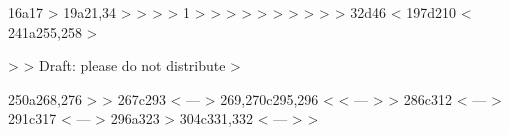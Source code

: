 16a17
> 
19a21,34
> %
> \def\inProgress{0}
> 
> \if\inProgress1
> \newcommand{\inProgressHide}[1]{#1} %
> \newcommand{\yinyu}[1]{{\color{red} Yinyu: #1}}
> \newcommand{\hinder}[1]{{\color{red}{Hinder: #1}}}
> \newcommand{\ron}[1]{ {\color{orange}Ron:  #1}}
> \else
> \newcommand{\inProgressHide}[1]{} %
> \newcommand{\yinyu}[1]{}
> \newcommand{\hinder}[1]{}
> \newcommand{\ron}[1]{}
> \fi
32d46
< 
197d210
< %
241a255,258
> \begin{center}
> \color{red}
> \large Draft: please do not distribute
> \end{center}
250a268,276
> \hinder{
> To do:
> \begin{enumerate}
> \item Make implementation consistent with paper (flip signs etc)
> \item Replace aggressive term with affine?
> \item Explain that Mehrotra's initialization etc is just shifted barrier on the dual
> \end{enumerate}
> }
> 
267c293
< %
---
> %
269,270c295,296
< %
< %
---
> %
> %
286c312
< %
---
> %
291c317
< %
---
> %
296a323
> %
304c331,332
< 
---
> %
> %
